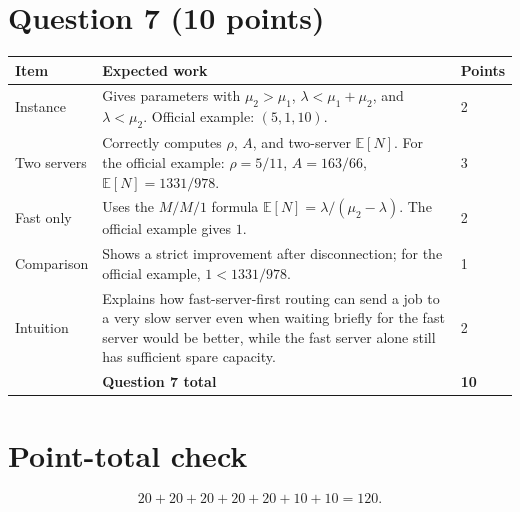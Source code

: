 \documentclass[11pt,letterpaper]{article}
\newcommand{\E}{\mathbb{E}}
\newcommand{\rubricsection}[2]{%
  \section*{\color{hkustblue}Question #1 \normalfont\normalsize (#2 points)}
}
\begin{document}
\rubricsection{7}{10}

\begin{longtable}{L{0.12\textwidth}L{0.72\textwidth}C{0.08\textwidth}}
\toprule
Item & Expected work & Points \\
\midrule
Instance & Gives parameters with $\mu_2>\mu_1$, $\lambda<\mu_1+\mu_2$, and
$\lambda<\mu_2$.  Official example: $(5,1,10)$. & 2\\
Two servers & Correctly computes $\rho$, $A$, and two-server $\E[N]$.  For the
official example: $\rho=5/11$, $A=163/66$, $\E[N]=1331/978$. & 3\\
Fast only & Uses the $M/M/1$ formula $\E[N]=\lambda/(\mu_2-\lambda)$.  The
official example gives $1$. & 2\\
Comparison & Shows a strict improvement after disconnection; for the official
example, $1<1331/978$. & 1\\
Intuition & Explains how fast-server-first routing can send a job to a very slow
server even when waiting briefly for the fast server would be better, while the fast
server alone still has sufficient spare capacity. & 2\\
\midrule
& \textbf{Question 7 total} & \textbf{10}\\
\bottomrule
\end{longtable}

\section*{Point-total check}

\[
20+20+20+20+20+10+10=\boxed{120}.
\]
\end{document}
